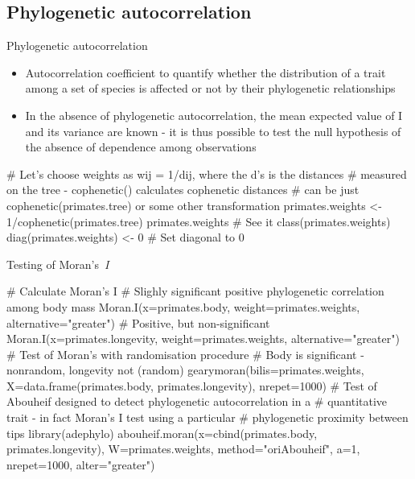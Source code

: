 \documentclass[compress, ucs, xelatex, 11pt, xcolor=svgnames,
  hyperref={
    bookmarks=true,
    unicode=true,
    colorlinks=true,
    pdftitle={Molecular data in R},
    plainpages=false,
    pdfauthor={Vojtech Zeisek},
    pdfsubject={Course about phylogeny and evolution in R},
    pdfcreator={XeLaTeX},
    pdfkeywords={R, evolution, phylogeny, molecular data},
    linkcolor=Tomato,
    anchorcolor=SaddleBrown,
    citecolor=Goldenrod,
    filecolor=DarkMagenta,
    menucolor=Sienna,
    urlcolor=DarkTurquoise,
    pdftex},
  url={hyphens, lowtilde} %
  ]{beamer}
\begin{document}
\subsection{Phylogenetic autocorrelation}

\begin{frame}[fragile]{Phylogenetic autocorrelation}
\begin{itemize}
 \item Autocorrelation coefficient to quantify whether the distribution of a trait among a set of species is affected or not by their phylogenetic relationships
 \item In the absence of phylogenetic autocorrelation, the mean expected value of I and its variance are known - it is thus possible to test the null hypothesis of the absence of dependence among observations
\end{itemize}
  \begin{spluscode}
    # Let's choose weights as wij = 1/dij, where the d’s is the distances
    # measured on the tree - cophenetic() calculates cophenetic distances
    # can be just cophenetic(primates.tree) or some other transformation
    primates.weights <- 1/cophenetic(primates.tree)
    primates.weights # See it
    class(primates.weights)
    diag(primates.weights) <- 0 # Set diagonal to 0
  \end{spluscode}
\end{frame}

\begin{frame}[fragile]{Testing of Moran's~\textit{I}}
  \begin{spluscode}
    # Calculate Moran's I
    # Slighly significant positive phylogenetic correlation among body mass
    Moran.I(x=primates.body, weight=primates.weights,
      alternative="greater")
    # Positive, but non-significant
    Moran.I(x=primates.longevity, weight=primates.weights,
      alternative="greater")
    # Test of Moran's with randomisation procedure
    # Body is significant - nonrandom, longevity not (random)
    gearymoran(bilis=primates.weights, X=data.frame(primates.body,
      primates.longevity), nrepet=1000)
    # Test of Abouheif designed to detect phylogenetic autocorrelation in a
    # quantitative trait - in fact Moran's I test using a particular
    # phylogenetic proximity between tips
    library(adephylo)
    abouheif.moran(x=cbind(primates.body, primates.longevity),
      W=primates.weights, method="oriAbouheif", a=1, nrepet=1000,
      alter="greater")
  \end{spluscode}
\end{frame}
\end{document}

